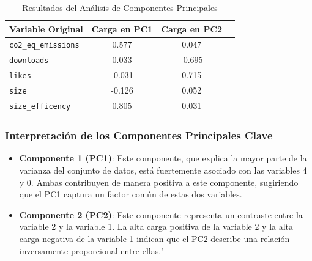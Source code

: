 \documentclass[journal]{IEEEtran}
\begin{document}
	\begin{table}[H]
		\centering
		\caption{Resultados del Análisis de Componentes Principales}
		\begin{tabular}{l c c c}
			\toprule
			Variable Original & Carga en PC1 & Carga en PC2 \\
			\midrule
			\texttt{co2\_eq\_emissions} & 0.577 & 0.047 \\
			\texttt{downloads} & 0.033 & -0.695 \\
			\texttt{likes} & -0.031 & 0.715 \\
			\texttt{size} & -0.126 & 0.052 \\
			\texttt{size\_efficency} & 0.805 & 0.031 \\
			\bottomrule
		\end{tabular}
		\label{tab:pca_results}
	\end{table}


	\subsubsection{Interpretación de los Componentes Principales Clave}
	\begin{itemize}
		\item \textbf{Componente 1 (PC1)}: Este componente, que explica la mayor parte de la varianza del conjunto de datos, está fuertemente asociado con las variables 4 y 0. Ambas contribuyen de manera positiva a este componente, sugiriendo que el PC1 captura un factor común de estas dos variables.
		\item \textbf{Componente 2 (PC2)}: Este componente representa un contraste entre la variable 2 y la variable 1. La alta carga positiva de la variable 2 y la alta carga negativa de la variable 1 indican que el PC2 describe una relación inversamente proporcional entre ellas."
	\end{itemize}
\end{document}
